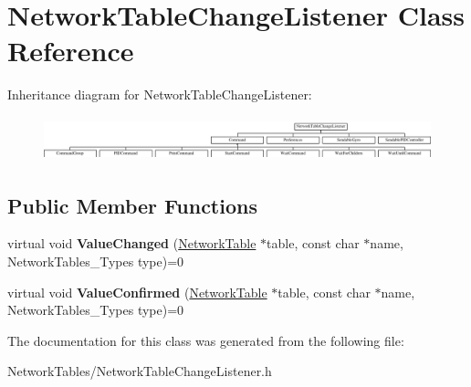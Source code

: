\hypertarget{classNetworkTableChangeListener}{
\section{NetworkTableChangeListener Class Reference}
\label{classNetworkTableChangeListener}
}
Inheritance diagram for NetworkTableChangeListener:\begin{figure}[H]
\begin{center}
\leavevmode
\includegraphics[height=1.290323cm]{classNetworkTableChangeListener}
\end{center}
\end{figure}
\subsection*{Public Member Functions}
\begin{DoxyCompactItemize}
\item 
\hypertarget{classNetworkTableChangeListener_a7cd3db8d26ed2be6e84c770855ef859a}{
virtual void {\bfseries ValueChanged} (\hyperlink{classNetworkTable}{NetworkTable} $\ast$table, const char $\ast$name, NetworkTables\_\-Types type)=0}
\label{classNetworkTableChangeListener_a7cd3db8d26ed2be6e84c770855ef859a}

\item 
\hypertarget{classNetworkTableChangeListener_a84246970b29bd634c7e2fc26a5b5f82b}{
virtual void {\bfseries ValueConfirmed} (\hyperlink{classNetworkTable}{NetworkTable} $\ast$table, const char $\ast$name, NetworkTables\_\-Types type)=0}
\label{classNetworkTableChangeListener_a84246970b29bd634c7e2fc26a5b5f82b}

\end{DoxyCompactItemize}


The documentation for this class was generated from the following file:\begin{DoxyCompactItemize}
\item 
NetworkTables/NetworkTableChangeListener.h\end{DoxyCompactItemize}
